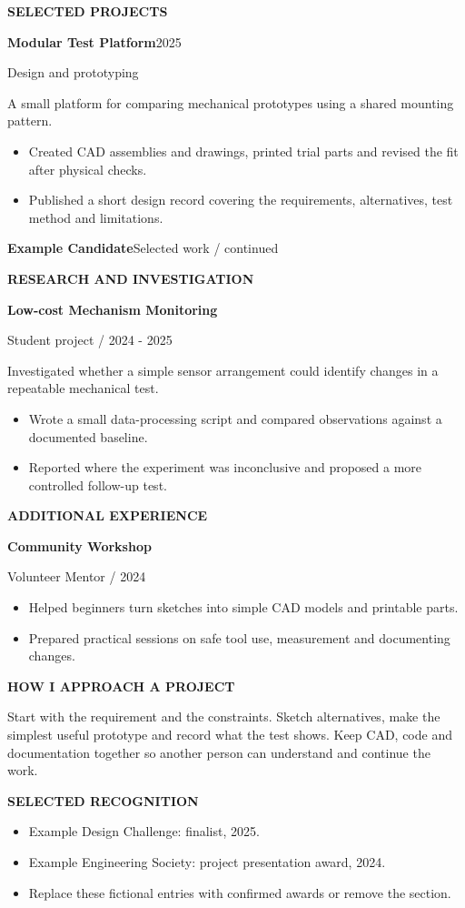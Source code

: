 \documentclass[10pt,a4paper]{article}
\newcommand{\candidate}{Example Candidate}
\newcommand{\continuation}{\textbf{\candidate}\hfill{\color{blue}Selected work / continued}\par\vspace{10pt}}
\newcommand{\entry}[3]{\textbf{#1}\hfill{\small\color{muted}#2}\par{\small\color{blue}#3}\par}
\newenvironment{cvpanel}[1]{\par\vspace{6pt}{\color{line}\hrule}\vspace{7pt}\begin{minipage}[t]{.23\linewidth}{\color{blue}\small\bfseries\MakeUppercase{#1}}\end{minipage}\hfill\begin{minipage}[t]{.73\linewidth}}{\end{minipage}\par\vspace{10pt}}
\begin{document}
\begin{cvpanel}{Selected projects}
\entry{Modular Test Platform}{2025}{Design and prototyping}
A small platform for comparing mechanical prototypes using a shared mounting pattern.
\begin{itemize}\item Created CAD assemblies and drawings, printed trial parts and revised the fit after physical checks.
\item Published a short design record covering the requirements, alternatives, test method and limitations.\end{itemize}
\end{cvpanel}
\newpage
\continuation
\begin{cvpanel}{Research and investigation}
\textbf{Low-cost Mechanism Monitoring}\par{\small\color{blue}Student project / 2024 - 2025}\par
Investigated whether a simple sensor arrangement could identify changes in a repeatable mechanical test.
\begin{itemize}\item Wrote a small data-processing script and compared observations against a documented baseline.
\item Reported where the experiment was inconclusive and proposed a more controlled follow-up test.\end{itemize}
\end{cvpanel}
\begin{cvpanel}{Additional experience}
\textbf{Community Workshop}\par{\small\color{blue}Volunteer Mentor / 2024}\par
\begin{itemize}\item Helped beginners turn sketches into simple CAD models and printable parts.
\item Prepared practical sessions on safe tool use, measurement and documenting changes.\end{itemize}
\end{cvpanel}
\begin{cvpanel}{How I approach a project}
Start with the requirement and the constraints. Sketch alternatives, make the simplest useful prototype and record what the test shows. Keep CAD, code and documentation together so another person can understand and continue the work.
\end{cvpanel}
\begin{cvpanel}{Selected recognition}
\begin{itemize}\item Example Design Challenge: finalist, 2025.
\item Example Engineering Society: project presentation award, 2024.
\item Replace these fictional entries with confirmed awards or remove the section.\end{itemize}
\end{cvpanel}
\end{document}
